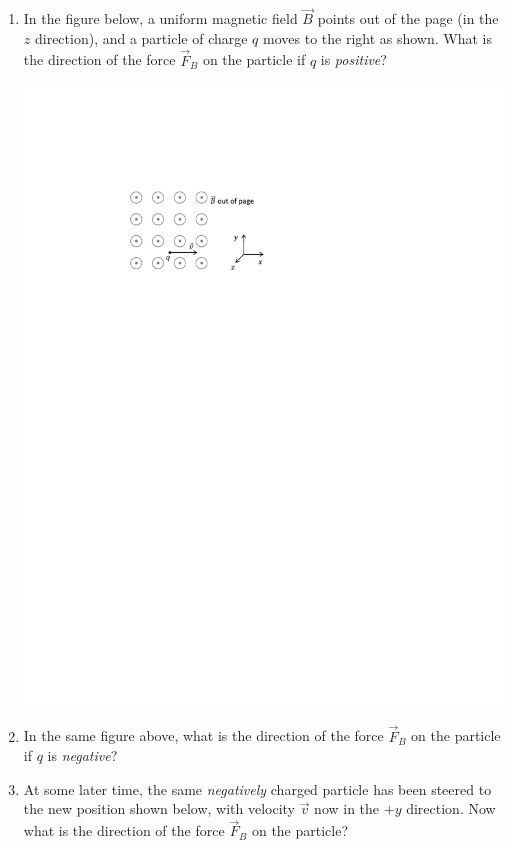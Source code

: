 \begin{enumerate}[labparts]
\item In the figure below, a uniform magnetic field $\vec B$ points out of the page (in the $z$ direction), and a particle of charge $q$ moves to the right as shown.  What is the direction of the force $\vec F_B$ on the particle if $q$ is \textit{positive}?

\medskip
\hspace{0.5in}\includegraphics{eoverm/q_in_field1.pdf}
\medskip

\item In the same figure above, what is the direction of the force $\vec F_B$ on the particle if $q$ is \textit{negative}?
\answerspace{0.5in}


\pagebreak[2]
\item At some later time, the same \textit{negatively} charged particle has been steered to the new position shown below, with velocity $\vec v$ now in the $+y$ direction.  Now what is the direction of the force $\vec F_B$ on the particle?


\end{enumerate}
